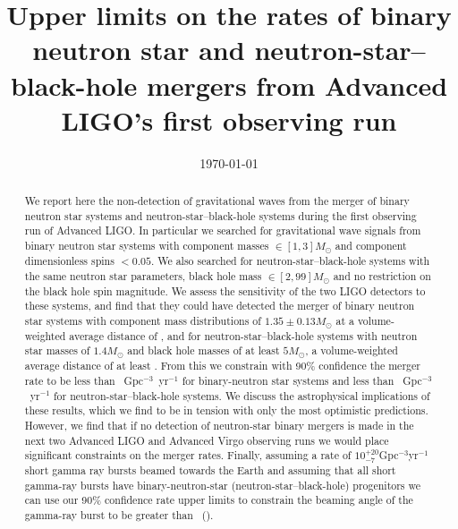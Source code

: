 \documentclass[twocolumn]{aastex6}
\begin{document}
\title{Upper limits on the rates of binary neutron star and neutron-star--black-hole mergers from Advanced LIGO's first observing run} 

\date{\today}

\begin{abstract}
We report here the non-detection of gravitational waves from the merger of binary neutron star systems and
neutron-star--black-hole systems during the first observing run of Advanced LIGO.
%
In particular we searched for gravitational wave signals from binary neutron
star systems with component masses $\in [1,3] M_{\odot}$ and component dimensionless
spins $< 0.05$. We also searched for neutron-star--black-hole systems with the same
neutron star parameters, black hole mass $\in [2,99] M_{\odot}$ and no restriction
on the black hole spin magnitude.
%
We assess the sensitivity of the two LIGO detectors to these systems, and 
find that they could have detected the merger of binary neutron star
systems with component mass distributions of $1.35\pm0.13 M_{\odot}$
at a volume-weighted average distance of \MainBNSRange, and for neutron-star--black-hole
systems with neutron star masses of $1.4M_\odot$ and black hole masses 
of at least $5M_\odot$, a volume-weighted average distance of at least \MainNSBHRangeFive.
%
From this we constrain with 90\% confidence the merger rate to be less than
\MainBNSULPyCBCHighSpin~Gpc$^{-3}$~yr$^{-1}$ for binary-neutron star systems
and less than \MainNSBHULPyCBCFiveIso~Gpc$^{-3}$~yr$^{-1}$ for
neutron-star--black-hole systems.
%
We discuss the astrophysical implications of these results, which we find to be in tension with only the
most optimistic predictions. However, we find that if no detection of neutron-star binary mergers is
made in the next two Advanced LIGO and Advanced Virgo observing runs we would place significant
constraints on the merger rates.
Finally, assuming a rate of $10^{+20}_{-7}$Gpc$^{-3}$yr$^{-1}$ short gamma ray bursts beamed towards the Earth
and assuming that all short gamma-ray bursts have binary-neutron-star (neutron-star--black-hole)
progenitors we can use our 90\% confidence rate upper limits to constrain the beaming angle of the gamma-ray
burst to be greater than \GRBBNSBeamingAngleConstraint\ (\GRBNSBHFiveBeamingAngleConstraint).

\end{abstract}

\maketitle
\end{document}
